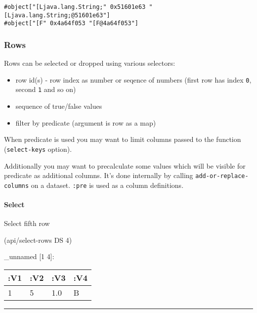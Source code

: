 \documentclass[]{article}
\newenvironment{Shaded}{\begin{snugshade}}{\end{snugshade}}
\newcommand{\DecValTok}[1]{\textcolor[rgb]{0.00,0.00,0.81}{#1}}
\newcommand{\NormalTok}[1]{#1}
\providecommand{\tightlist}{%
  \setlength{\itemsep}{0pt}\setlength{\parskip}{0pt}}
\let\oldparagraph\paragraph
\renewcommand{\paragraph}[1]{\oldparagraph{#1}\mbox{}}
\begin{document}
\begin{verbatim}
#object["[Ljava.lang.String;" 0x51601e63 "[Ljava.lang.String;@51601e63"]
#object["[F" 0x4a64f053 "[F@4a64f053"]
\end{verbatim}

\hypertarget{rows}{%
\subsubsection{Rows}\label{rows}}

Rows can be selected or dropped using various selectors:

\begin{itemize}
\tightlist
\item
  row id(s) - row index as number or seqence of numbers (first row has
  index \texttt{0}, second \texttt{1} and so on)
\item
  sequence of true/false values
\item
  filter by predicate (argument is row as a map)
\end{itemize}

When predicate is used you may want to limit columns passed to the
function (\texttt{select-keys} option).

Additionally you may want to precalculate some values which will be
visible for predicate as additional columns. It's done internally by
calling \texttt{add-or-replace-columns} on a dataset. \texttt{:pre} is
used as a column definitions.

\hypertarget{select-1}{%
\paragraph{Select}\label{select-1}}

Select fifth row

\begin{Shaded}
\begin{Highlighting}[]
\NormalTok{(api/select-rows DS }\DecValTok{4}\NormalTok{)}
\end{Highlighting}
\end{Shaded}

\_unnamed {[}1 4{]}:

\begin{longtable}[]{@{}llll@{}}
\toprule
:V1 & :V2 & :V3 & :V4\tabularnewline
\midrule
\endhead
1 & 5 & 1.0 & B\tabularnewline
\bottomrule
\end{longtable}

\begin{center}\rule{0.5\linewidth}{0.5pt}\end{center}
\end{document}
